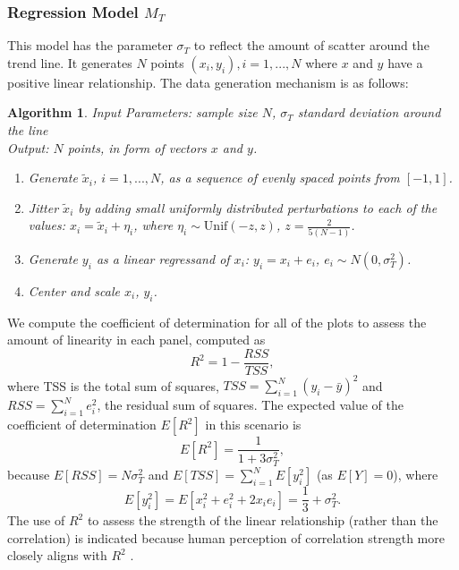 \documentclass[12pt]{article}\usepackage[]{graphicx}\usepackage[]{color}
\newtheorem{algorithm}[theorem]{Algorithm}
\begin{document}
\subsubsection{Regression Model \texorpdfstring{$M_T$}{Mt}}
This model has the parameter $\sigma_T$ to reflect the amount of scatter around the trend line. It generates $N$ points $(x_i, y_i), i=1, ..., N$ where $x$ and $y$ have a positive linear relationship. The data generation mechanism is as follows: 

\begin{algorithm}\hfill\newline
  Input Parameters: sample size $N$, $\sigma_T$ standard deviation around the line \\
  Output: $N$ points, in form of vectors $x$ and $y$.
  \begin{enumerate}
    \item Generate $\tilde{x}_i$, $i=1, ..., N$, as a sequence of evenly spaced points from $[-1, 1]$. 
    \item Jitter $\tilde{x}_i$ by adding small uniformly distributed perturbations to each of the values: $x_i = \tilde{x}_i + \eta_i$, where $\eta_i \sim \text{Unif}(-z, z)$, $z = \frac{2}{5(N-1)}$.
    \item Generate $y_i$ as a linear regressand of $x_i$: $y_i = x_i + e_i$, $e_i \sim N(0, \sigma^2_T)$.
    \item Center and scale $x_i$, $y_i$.
  \end{enumerate}
\end{algorithm}

We compute the coefficient of determination for all of the plots to assess the amount of linearity in each panel, computed as 
\begin{equation}\label{eq:linearMeasure}
R^2 = 1 - \frac{RSS}{TSS},
\end{equation}
where TSS is the total sum of squares, $TSS = \sum_{i=1}^N \left(y_i - \bar{y}\right)^2$ and $RSS = \sum_{i=1}^N e_i^2$, the residual sum of squares.
The expected value of the coefficient of determination $E\left[R^2\right]$ in this scenario is 
\[
E\left[R^2\right] =  \frac{1}{1 + 3\sigma^2_T},
\]
because
$E[RSS] = N\sigma^2_T$ and $E[TSS] = \sum_{i=1}^N E\left[y_i^2\right]$  (as $E[Y] = 0$), where 
$$
E\left[y_i^2\right] = E\left[x_i^2 + e_i^2 + 2 x_ie_i\right] = \frac{1}{3} + \sigma^2_T. 
$$
The use of $R^2$ to assess the strength of the linear relationship (rather than the correlation) is indicated because human perception of correlation strength more closely aligns with $R^2$ \citep{bobko1979perception,lewandowsky1989perception}. 
\end{document}
